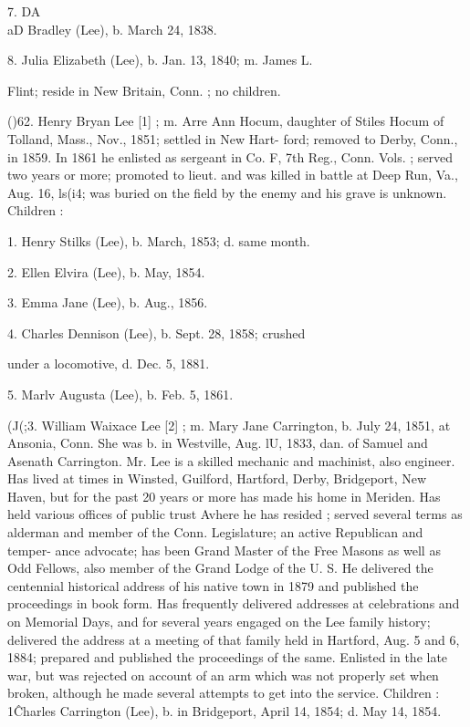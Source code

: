 7. DA\\aD Bradley (Lee), b. March 24, 1838. 

8. Julia Elizabeth (Lee), b. Jan. 13, 1840; m. James L. 

Flint; reside in New Britain, Conn. ; no children. 

()62. Henry Bryan Lee [1] ; m. Arre Ann Hocum, daughter of Stiles 
Hocum of Tolland, Mass., Nov., 1851; settled in New Hart- 
ford; removed to Derby, Conn., in 1859. In 1861 he enlisted 
as sergeant in Co. F, 7th Reg., Conn. Vols. ; served two years 
or more; promoted to lieut. and was killed in battle at Deep 
Run, Va., Aug. 16, ls(i4; was buried on the field by the enemy 
and his grave is unknown. Children : 

1. Henry Stilks (Lee), b. March, 1853; d. same month. 

2. Ellen Elvira (Lee), b. May, 1854. 

3. Emma Jane (Lee), b. Aug., 1856. 




4. Charles Dennison (Lee), b. Sept. 28, 1858; crushed 

under a locomotive, d. Dec. 5, 1881. 

5. Marlv Augusta (Lee), b. Feb. 5, 1861. 

(J(;3. William Waixace Lee [2] ; m. Mary Jane Carrington, b. July 
24, 1851, at Ansonia, Conn. She was b. in Westville, Aug. lU, 
1833, dan. of Samuel and Asenath Carrington. Mr. Lee is a 
skilled mechanic and machinist, also engineer. Has lived at 
times in Winsted, Guilford, Hartford, Derby, Bridgeport, New 
Haven, but for the past 20 years or more has made his home in 
Meriden. Has held various offices of public trust Avhere he 
has resided ; served several terms as alderman and member 
of the Conn. Legislature; an active Republican and temper- 
ance advocate; has been Grand Master of the Free Masons 
as well as Odd Fellows, also member of the Grand Lodge of 
the U. S. He delivered the centennial historical address of 
his native town in 1879 and published the proceedings in book 
form. Has frequently delivered addresses at celebrations and 
on Memorial Days, and for several years engaged on the Lee 
family history; delivered the address at a meeting of that 
family held in Hartford, Aug. 5 and 6, 1884; prepared and 
published the proceedings of the same. Enlisted in the late 
war, but was rejected on account of an arm which was not 
properly set when broken, although he made several attempts 
to get into the service. Children : 
1\^ Charles Carrington (Lee), b. in Bridgeport, April 14, 
1854; d. May 14, 1854. 

